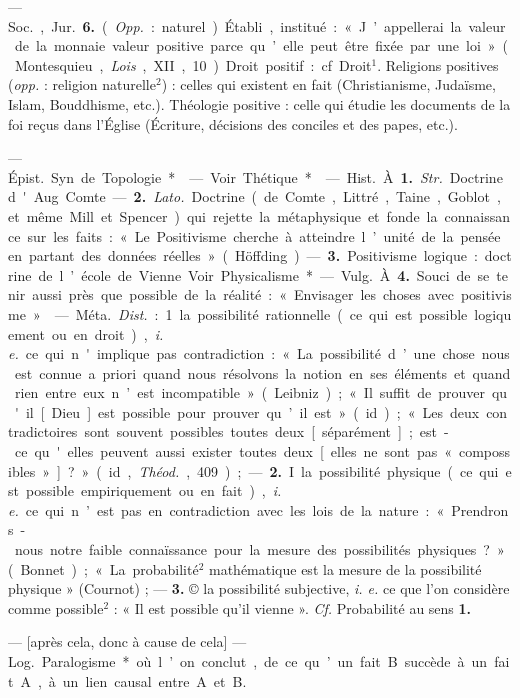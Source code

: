 \begin{itemize}[leftmargin=1cm, label=, itemsep=1pt]
— \si{Soc.}, \si{Jur.} {\bf 6.} ({\it Opp.} : naturel).
Établi, institué : « J’appellerai la
valeur de la monnaie valeur positive parce qu’elle peut être fixée par
une loi » (Montesquieu, {\it Lois}, XII,
10). Droit positif : cf. Droit$^1$. Religions positives ({\it opp.} : religion naturelle$^2$) : celles qui existent en fait
(Christianisme, Judaïsme, Islam,
Bouddhisme, etc.). Théologie positive : celle qui étudie les documents
de la foi reçus dans l’Église (Écriture, décisions des conciles et des
papes, etc.).

 — \si{Épist.}
Syn. de Topologie*.

 — Voir Thétique*.

 — \si{Hist.} À. {\bf 1.} {\it Str.} Doctrine d'Aug. Comte. — {\bf 2.} {\it Lato.}
Doctrine (de Comte, Littré, Taine,
Goblot, et même Mill et Spencer)
qui rejette la métaphysique et fonde
la connaissance sur les faits : « Le
Positivisme cherche à atteindre
l’unité de la pensée en partant des
données réelles » (Höffding). —
 {\bf 3.} Positivisme logique : doctrine de
l’école de Vienne. Voir Physicalisme*

— \si{Vulg.} À. {\bf 4.} Souci de se tenir
aussi près que possible de la réalité :
« Envisager les choses avec positivisme. »

 — \si{Méta.} {\it Dist.} :
1. la possibilité rationnelle (ce qui
est possible logiquement ou en droit),
{\it i. e.} ce qui n'implique pas contradiction : « La possibilité d’une chose
nous est connue a priori quand nous
résolvons la notion en ses éléments
et quand rien entre eux n’est incompatible » (Leibniz) ; « Il suffit de
prouver qu'il [Dieu] est possible
pour prouver qu’il est » (id.) ; « Les
deux contradictoires sont souvent
possibles toutes deux [séparément];
est-ce qu'elles peuvent aussi exister
toutes deux [elles ne sont pas « compossibles »] ? » (id., {\it Théod.}, 409) ; —
 {\bf 2.} I. la possibilité physique (ce qui
est possible empiriquement ou en
fait), {\it i. e.} ce qui n’est pas en contradiction avec les lois de la nature :
« Prendrons-nous notre faible connaïssance pour la mesure des possibilités physiques ? » (Bonnet) ; « La
probabilité$^2$ mathématique est la
mesure de la possibilité physique »
(Cournot) ; — {\bf 3.} © la possibilité
subjective, {\it i. e.} ce que l’on considère
comme possible$^2$ : « Il est possible
qu'il vienne ». {\it Cf.} Probabilité au
sens {\bf 1.}

 — [après cela,
donc à cause de cela] — \si{Log.} Paralogisme* où l’on conclut, de ce qu’un
fait B succède à un fait A, à un lien
causal entre A et B.


\end{itemize}
